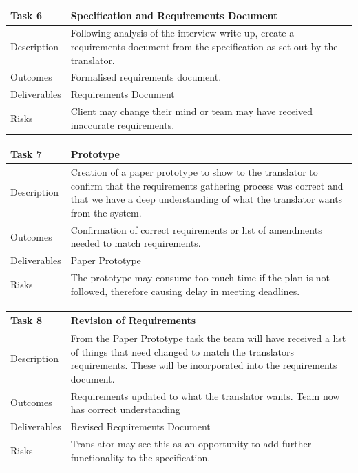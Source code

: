 \documentclass{l3proj}
\begin{document}
\begin{center}
    \begin{tabular}{ | l | p{12cm} |}
    \hline	
    Task 6 & Specification and Requirements Document \\ \hline
    Description & Following analysis of the interview write-up, create a requirements document from the specification as set out by the translator. \\ \hline   
    Outcomes & Formalised requirements document. \\ \hline
    Deliverables & Requirements Document \\ \hline
    Risks & Client may change their mind or team may have received inaccurate requirements. \\ 
    \hline
    \end{tabular}
\end{center}

\begin{center}
    \begin{tabular}{ | l | p{12cm} |}
    \hline	
    Task 7 & Prototype \\ \hline
    Description & Creation of a paper prototype to show to the translator to confirm that the requirements gathering process was correct and that we have a deep understanding of what the translator wants from the system. \\ \hline   
    Outcomes & Confirmation of correct requirements or list of amendments needed to match requirements. \\ \hline
    Deliverables & Paper Prototype \\ \hline
    Risks & The prototype may consume too much time if the plan is not followed, therefore causing delay in meeting deadlines. \\ 
    \hline
    \end{tabular}
\end{center}

\begin{center}
    \begin{tabular}{ | l | p{12cm} |}
    \hline	
    Task 8 & Revision of Requirements \\ \hline
    Description & From the Paper Prototype task the team will have received a list of things that need changed to match the translators requirements. These will be incorporated into the requirements document. \\ \hline   
    Outcomes & Requirements updated to what the translator wants. Team now has correct understanding \\ \hline
    Deliverables & Revised Requirements Document \\ \hline
    Risks & Translator may see this as an opportunity to add further functionality to the specification. \\ 
    \hline
    \end{tabular}
\end{center}
\end{document}
